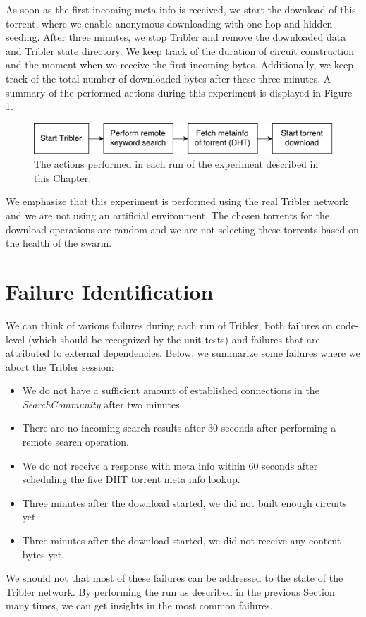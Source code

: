 As soon as the first incoming meta info is received, we start the download of this torrent, where we enable anonymous downloading with one hop and hidden seeding. After three minutes, we stop Tribler and remove the downloaded data and Tribler state directory. We keep track of the duration of circuit construction and the moment when we receive the first incoming bytes. Additionally, we keep track of the total number of downloaded bytes after these three minutes. A summary of the performed actions during this experiment is displayed in Figure \ref{fig:big-experiment-setup}.\\

\begin{figure}[!h]
	\centering
	\includegraphics[width=0.7\columnwidth]{images/big_experiment/big_experiment_setup}
	\caption{The actions performed in each run of the experiment described in this Chapter.}
	\label{fig:big-experiment-setup}
\end{figure}

We emphasize that this experiment is performed using the real Tribler network and we are not using an artificial environment. The chosen torrents for the  download operations are random and we are not selecting these torrents based on the health of the swarm.

\section{Failure Identification}
We can think of various failures during each run of Tribler, both failures on code-level (which should be recognized by the unit tests) and failures that are attributed to external dependencies. Below, we summarize some failures where we abort the Tribler session:
\begin{itemize}
	\item We do not have a sufficient amount of established connections in the \emph{SearchCommunity} after two minutes.
	\item There are no incoming search results after 30 seconds after performing a remote search operation.
	\item We do not receive a response with meta info within 60 seconds after scheduling the five DHT torrent meta info lookup.
	\item Three minutes after the download started, we did not built enough circuits yet.
	\item Three minutes after the download started, we did not receive any content bytes yet.
\end{itemize}
We should not that most of these failures can be addressed to the state of the Tribler network. By performing the run as described in the previous Section many times, we can get insights in the most common failures.

